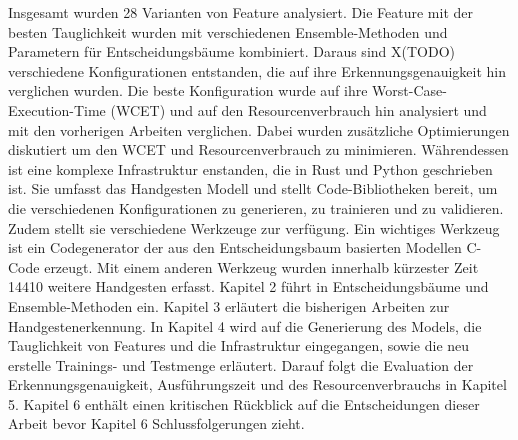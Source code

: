 \newline
Insgesamt wurden 28 Varianten von Feature analysiert. Die Feature mit der besten Tauglichkeit wurden mit verschiedenen Ensemble-Methoden und Parametern für Entscheidungsbäume kombiniert. Daraus sind
X(TODO) verschiedene Konfigurationen entstanden, die auf ihre Erkennungsgenauigkeit hin verglichen wurden. Die beste Konfiguration wurde auf ihre Worst-Case-Execution-Time (WCET) und auf den Resourcenverbrauch
hin analysiert und mit den vorherigen Arbeiten verglichen. Dabei wurden zusätzliche Optimierungen diskutiert um den WCET und Resourcenverbrauch zu minimieren. Währendessen ist eine komplexe Infrastruktur
enstanden, die in Rust und Python geschrieben ist. Sie umfasst das Handgesten Modell und stellt Code-Bibliotheken bereit, um die verschiedenen Konfigurationen zu generieren, zu trainieren und zu validieren.
Zudem stellt sie verschiedene Werkzeuge zur verfügung. Ein wichtiges Werkzeug ist ein Codegenerator der aus den Entscheidungsbaum basierten Modellen C-Code erzeugt. Mit einem anderen Werkzeug wurden
innerhalb kürzester Zeit 14410 weitere Handgesten erfasst.
\newline
\newline
Kapitel 2 führt in Entscheidungsbäume und Ensemble-Methoden ein. Kapitel 3 erläutert die bisherigen Arbeiten zur Handgestenerkennung. In Kapitel 4 wird auf die Generierung des Models, die Tauglichkeit von
Features und die Infrastruktur eingegangen, sowie die neu erstelle Trainings- und Testmenge erläutert. Darauf folgt die Evaluation der Erkennungsgenauigkeit, Ausführungszeit und des Resourcenverbrauchs in
Kapitel 5. Kapitel 6 enthält einen kritischen Rückblick auf die Entscheidungen dieser Arbeit bevor Kapitel 6 Schlussfolgerungen zieht.